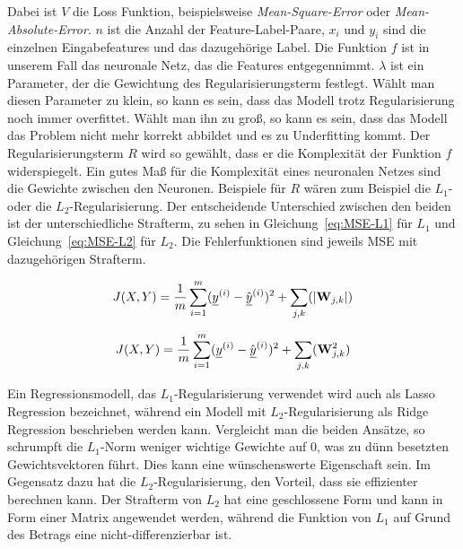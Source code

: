 Dabei ist \(V\) die Loss Funktion, beispielsweise \textit{Mean-Square-Error} oder \textit{Mean-Absolute-Error}.
\(n\) ist die Anzahl der Feature-Label-Paare,
\(x_i\) und \(y_i\) sind die einzelnen Eingabefeatures und das dazugehörige Label.
Die Funktion \(f\) ist in unserem Fall das neuronale Netz, das die Features entgegennimmt.
\(\lambda\) ist ein Parameter, der die Gewichtung des Regularisierungsterm festlegt.
Wählt man diesen Parameter zu klein, so kann es sein, dass das Modell trotz Regularisierung noch immer overfittet.
Wählt man ihn zu groß, so kann es sein, dass das Modell das Problem nicht mehr korrekt abbildet und es zu Underfitting kommt.
Der Regularisierungsterm \(R\) wird so gewählt, dass er die Komplexität der Funktion \(f\) widerspiegelt.
Ein gutes Maß für die Komplexität eines neuronalen Netzes sind die Gewichte zwischen den Neuronen.
Beispiele für \(R\) wären zum Beispiel die \(L_1\)- oder die \(L_2\)-Regularisierung. %
Der entscheidende Unterschied zwischen den beiden ist der unterschiedliche Strafterm, zu sehen in Gleichung~\eqref{eq:MSE-L1} für \(L_1\) und Gleichung~\eqref{eq:MSE-L2} für \(L_2\). 
Die Fehlerfunktionen sind jeweils MSE mit dazugehörigen Strafterm.

\begin{equation} \label{eq:MSE-L1}
	J(X, Y) = \frac{1}{m} \sum_{i=1}^{m} ({\underline{y}}^{(i)} - \hat{{\underline{y}}}^{(i)})^2 + \sum_{j, k} (|{{\mathbf{W}}}_{j,k}|)
\end{equation} 

\begin{equation} \label{eq:MSE-L2}
	J(X, Y) = \frac{1}{m} \sum_{i=1}^{m} ({\underline{y}}^{(i)} - \hat{{\underline{y}}}^{(i)})^2 + \sum_{j, k} ({{\mathbf{W}}}_{j,k}^2)
\end{equation} 


Ein Regressionsmodell, das \(L_1\)-Regularisierung verwendet wird auch als Lasso Regression bezeichnet, 
während ein Modell mit \(L_2\)-Regularisierung als Ridge Regression beschrieben werden kann.
Vergleicht man die beiden Ansätze, so schrumpft die \(L_1\)-Norm weniger wichtige Gewichte auf 0, was zu dünn besetzten Gewichtsvektoren führt.
Dies kann eine wünschenswerte Eigenschaft sein.
Im Gegensatz dazu hat die \(L_2\)-Regularisierung, den Vorteil, dass sie effizienter berechnen kann.
Der Strafterm von \(L_2\) hat eine geschlossene Form und kann in Form einer Matrix angewendet werden, während die Funktion von \(L_1\) auf Grund des Betrags eine nicht-differenzierbar ist.


